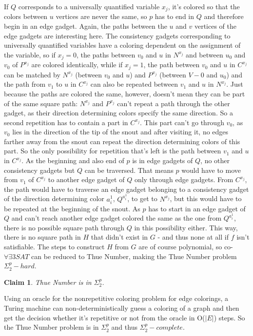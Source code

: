 \documentclass[12pt,a4paper]{article}
\newtheorem{claim}{Claim}
\begin{document}
\newline
If $Q$ corresponds to a universally quantified variable $x_j$, it's colored so that the colors between $u$ vertices are never the same, so $p$ has to end in $Q$ and therefore begin in an edge gadget. Again, the paths between the $u$ and $v$ vertices of the edge gadgets are interesting here. The consistency gadgets corresponding to universally quantified variables have a coloring dependent on the assignment of the variable, so if $x_j = 0$, the paths between $v_0$ and $u$ in $N^{x_j}$ and between $u_0$ and $v_0$ of $P^{x_j}$ are colored identically, while if $x_j = 1$, the path between $v_0$ and $u$ in $C^{x_j}$ can be matched by $N^{x_j}$ (between $v_0$ and $u$) and $P^{x_j}$ (between $V-0$ and $u_0$) and the path from $v_1$ to $u$ in $C^{x_j}$ can also be repeated between $v_1$ and $u$ in $N^{x_j}$. Just because the paths are colored the same, however, doesn't mean they can be part of the same square path:
\newline
$N^{x_j}$ and $P^{x_j}$ can't repeat a path through the other gadget, as their direction determining colors specify the same direction. So a second repetition has to contain a part in $C^{x_j}$. This part can't go through $v_0$, as $v_0$ lies in the direction of the tip of the snout and after visiting it, no edges farther away from the snout can repeat the direction determining colors of this part. So the only possibility for repetition that's left is the path between $v_1$ and $u$ in $C^{x_j}$. As the beginning and also end of $p$ is in edge gadgets of $Q$, no other consistency gadgets but $Q$ can be traversed. That means $p$ would have to move from $v_1$ of $C^{x_j}$ to another edge gadget of $Q$ only through edge gadgets. From $C^{x_j}$, the path would have to traverse an edge gadget belonging to a consistency gadget of the direction determining color $a_i^1$, $Q^{a_i^1}$, to get to $N^{x_j}$, but this would have to be repeated at the beginning of the snout. As $p$ has to start in an edge gadget of $Q$ and can't reach another edge gadget colored the same as the one from $Q^{a_i^1}$, there is no possible square path through $Q$ in this possibility either. 
\newline
This way, there is no square path in $H$ that didn't exist in $G$ - and thus none at all if $f$ isn't satisfiable. The steps to construct $H$ from $G$ are of course polynomial, so co-$\forall\exists3SAT$ can be reduced to Thue Number, making the Thue Number problem $\Sigma^p_2-hard$.
\newline
\begin{claim}
Thue Number is in $\Sigma^p_2$.
\end{claim}
Using an oracle for the nonrepetitive coloring problem for edge colorings, a Turing machine can non-deterministically guess a coloring of a graph and then get the decision whether it's repetitive or not from the oracle in O($|E|$) steps. So the Thue Number problem is in $\Sigma^p_2$ and thus $\Sigma^p_2-complete$.
\newpage	
\end{document}
